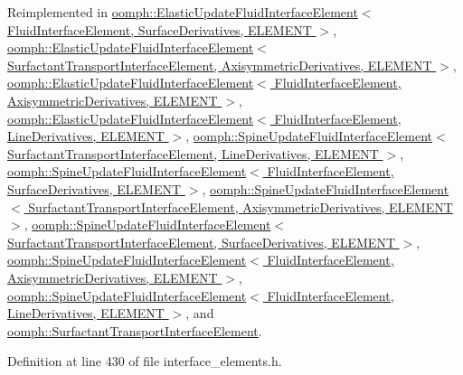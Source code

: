 Reimplemented in \hyperlink{classoomph_1_1ElasticUpdateFluidInterfaceElement_a15c3d2912325ace17676366c1469121f}{oomph\+::\+Elastic\+Update\+Fluid\+Interface\+Element$<$ Fluid\+Interface\+Element, Surface\+Derivatives, E\+L\+E\+M\+E\+N\+T $>$}, \hyperlink{classoomph_1_1ElasticUpdateFluidInterfaceElement_a15c3d2912325ace17676366c1469121f}{oomph\+::\+Elastic\+Update\+Fluid\+Interface\+Element$<$ Surfactant\+Transport\+Interface\+Element, Axisymmetric\+Derivatives, E\+L\+E\+M\+E\+N\+T $>$}, \hyperlink{classoomph_1_1ElasticUpdateFluidInterfaceElement_a15c3d2912325ace17676366c1469121f}{oomph\+::\+Elastic\+Update\+Fluid\+Interface\+Element$<$ Fluid\+Interface\+Element, Axisymmetric\+Derivatives, E\+L\+E\+M\+E\+N\+T $>$}, \hyperlink{classoomph_1_1ElasticUpdateFluidInterfaceElement_a15c3d2912325ace17676366c1469121f}{oomph\+::\+Elastic\+Update\+Fluid\+Interface\+Element$<$ Fluid\+Interface\+Element, Line\+Derivatives, E\+L\+E\+M\+E\+N\+T $>$}, \hyperlink{classoomph_1_1SpineUpdateFluidInterfaceElement_a3958845051cafecd8e73745fc04c7a78}{oomph\+::\+Spine\+Update\+Fluid\+Interface\+Element$<$ Surfactant\+Transport\+Interface\+Element, Line\+Derivatives, E\+L\+E\+M\+E\+N\+T $>$}, \hyperlink{classoomph_1_1SpineUpdateFluidInterfaceElement_a3958845051cafecd8e73745fc04c7a78}{oomph\+::\+Spine\+Update\+Fluid\+Interface\+Element$<$ Fluid\+Interface\+Element, Surface\+Derivatives, E\+L\+E\+M\+E\+N\+T $>$}, \hyperlink{classoomph_1_1SpineUpdateFluidInterfaceElement_a3958845051cafecd8e73745fc04c7a78}{oomph\+::\+Spine\+Update\+Fluid\+Interface\+Element$<$ Surfactant\+Transport\+Interface\+Element, Axisymmetric\+Derivatives, E\+L\+E\+M\+E\+N\+T $>$}, \hyperlink{classoomph_1_1SpineUpdateFluidInterfaceElement_a3958845051cafecd8e73745fc04c7a78}{oomph\+::\+Spine\+Update\+Fluid\+Interface\+Element$<$ Surfactant\+Transport\+Interface\+Element, Surface\+Derivatives, E\+L\+E\+M\+E\+N\+T $>$}, \hyperlink{classoomph_1_1SpineUpdateFluidInterfaceElement_a3958845051cafecd8e73745fc04c7a78}{oomph\+::\+Spine\+Update\+Fluid\+Interface\+Element$<$ Fluid\+Interface\+Element, Axisymmetric\+Derivatives, E\+L\+E\+M\+E\+N\+T $>$}, \hyperlink{classoomph_1_1SpineUpdateFluidInterfaceElement_a3958845051cafecd8e73745fc04c7a78}{oomph\+::\+Spine\+Update\+Fluid\+Interface\+Element$<$ Fluid\+Interface\+Element, Line\+Derivatives, E\+L\+E\+M\+E\+N\+T $>$}, and \hyperlink{classoomph_1_1SurfactantTransportInterfaceElement_adedf33390efdf652e169f8bd38eb2350}{oomph\+::\+Surfactant\+Transport\+Interface\+Element}.



Definition at line 430 of file interface\+\_\+elements.\+h.

